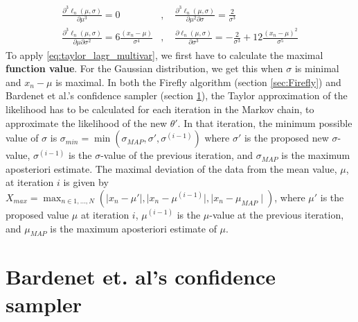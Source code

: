 \documentclass{article}
\theoremstyle{definition}
\begin{document}
\begin{equation*}
\begin{split}
    \frac{\partial^3 \ell_n\left(\mu, \sigma\right)}{\partial\mu^3} = 0 &, \quad \frac{\partial^3\ell_n\left(\mu, \sigma\right)}{\partial\mu^2\partial \sigma} = \frac{2 }{\sigma^3} \\
    \frac{\partial^3\ell_n\left(\mu, \sigma\right)}{\partial\mu\partial\sigma^2} = 6\frac{\left(x_n - \mu \right)}{\sigma^4} &, \quad \frac{\partial \ell_n\left(\mu, \sigma\right)}{\partial\sigma^3} = -\frac{2}{\sigma^3} + 12\frac{\left(x_n - \mu\right)^2}{\sigma^5}
    \end{split}
\end{equation*}
To apply \eqref{eq:taylor_lagr_multivar}, we first have to calculate the maximal \textbf{function value}. For the Gaussian distribution, we get this when $\sigma$ is minimal and $x_n - \mu$ is maximal. In both the Firefly algorithm (section \ref{sec:Firefly}) and Bardenet et al.'s confidence sampler (section \ref{sec:conf_sampler}), the Taylor approximation of the likelihood has to be calculated for each iteration in the Markov chain, to approximate the likelihood of the new $\theta'$. In that iteration, the minimum possible value of $\sigma$ is $\sigma_{min} = \min\left(\sigma_{MAP}, \sigma', \sigma^{(i-1)}\right) $ where $\sigma'$ is the proposed new $\sigma$-value, $\sigma^{(i-1)}$ is the $\sigma$-value of the previous iteration, and $\sigma_{MAP}$ is the maximum aposteriori estimate. The maximal deviation of the data from the mean value, $\mu$, at iteration $i$ is given by $X_{max} = \max_{n\in 1,\ldots, N} \left(\mid x_n - \mu'\mid, \mid x_n - \mu^{(i-1)}\mid, \mid x_n - \mu_{MAP}\mid\right)$, where $\mu'$ is the proposed value $\mu$ at iteration $i$, $\mu^{(i-1)}$ is the $\mu$-value at the previous iteration, and $\mu_{MAP}$ is the maximum aposteriori estimate of $\mu$. 
\section{Bardenet et. al's confidence sampler}\label{sec:conf_sampler}
\end{document}
